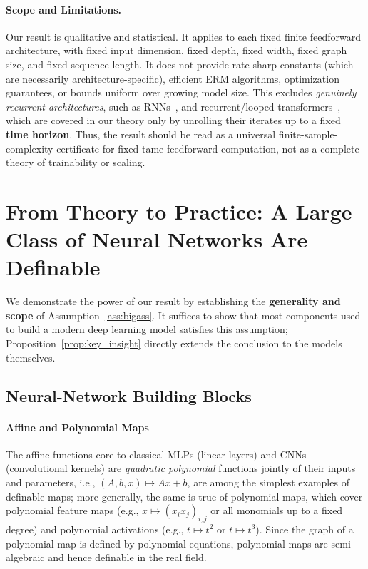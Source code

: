\documentclass{article}
\theoremstyle{plain}
\theoremstyle{definition}
\theoremstyle{remark}
\theoremstyle{plain}
\numberwithin{thm}{section}
\theoremstyle{definition}
\numberwithin{equation}{section}
\begin{document}
\paragraph{Scope and Limitations.}
Our result is qualitative and statistical.  It applies to each fixed finite feedforward architecture, with fixed input dimension, fixed depth, fixed width, fixed graph size, and fixed sequence length.  It does not provide rate-sharp constants (which are necessarily architecture-specific), efficient ERM algorithms, optimization guarantees, or bounds uniform over growing model size.  
This excludes \textit{genuinely} \emph{recurrent architectures}, such as RNNs~\cite{Elman1990FindingStructureInTime,HochreiterSchmidhuber1997LongShortTermMemory}, and recurrent/looped transformers~\cite{Dehghani2019Universaltransformers,Giannou2023Loopedtransformers}, which are covered in our theory only by unrolling their iterates up to a fixed \textbf{time horizon}.
Thus, the result should be read as a universal finite-sample-complexity certificate for fixed tame feedforward computation, not as a complete theory of trainability or scaling.

\section{From Theory to Practice: A Large Class of Neural Networks Are Definable}
\label{s:Examples}
We demonstrate the power of our result by establishing the \textbf{generality and scope} of Assumption~\ref{ass:bigass}. It suffices to show that most components used to build a modern deep learning model satisfies this assumption; Proposition~\ref{prop:key_insight} directly extends the conclusion to the models themselves.



\subsection{Neural-Network Building Blocks}

\paragraph{Affine and Polynomial Maps}
The affine functions core to classical MLPs (linear layers) and CNNs (convolutional kernels) are \textit{quadratic polynomial} functions jointly of their inputs and parameters, i.e., $(A,b,x)\mapsto Ax+b$,
are among the simplest examples of definable maps; more generally, the same is
true of polynomial maps, which cover polynomial feature maps (e.g.,
$x\mapsto (x_i x_j)_{i,j}$ or all monomials up to a fixed degree) and polynomial
activations (e.g., $t\mapsto t^2$ or $t\mapsto t^3$). Since the graph of a polynomial map is defined by polynomial equations, polynomial maps are semi-algebraic and hence definable in the real field.
\end{document}
